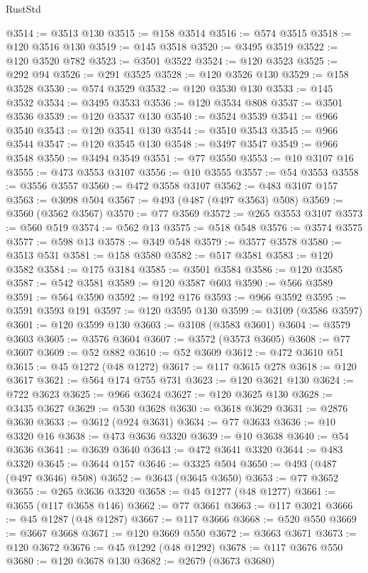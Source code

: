\begin{lexlean}{RustStd}
\begin{coremodule}
@3514 := @3513 @130
@3515 := @158 @3514
@3516 := @574 @3515
@3518 := @120 @3516 @130
@3519 := @145 @3518
@3520 := @3495 @3519
@3522 := @120 @3520 @782
@3523 := @3501 @3522
@3524 := @120 @3523
@3525 := @292 @94
@3526 := @291 @3525
@3528 := @120 @3526 @130
@3529 := @158 @3528
@3530 := @574 @3529
@3532 := @120 @3530 @130
@3533 := @145 @3532
@3534 := @3495 @3533
@3536 := @120 @3534 @808
@3537 := @3501 @3536
@3539 := @120 @3537 @130
@3540 := @3524 @3539
@3541 := @966 @3540
@3543 := @120 @3541 @130
@3544 := @3510 @3543
@3545 := @966 @3544
@3547 := @120 @3545 @130
@3548 := @3497 @3547
@3549 := @966 @3548
@3550 := @3494 @3549
@3551 := @77 @3550
@3553 := @10 @3107 @16
@3555 := @473 @3553 @3107
@3556 := @10 @3555
@3557 := @54 @3553
@3558 := @3556 @3557
@3560 := @472 @3558 @3107
@3562 := @483 @3107 @157
@3563 := @3098 @504
@3567 := @493 (@487 (@497 @3563) @508)
@3569 := @3560 (@3562 @3567)
@3570 := @77 @3569
@3572 := @265 @3553 @3107
@3573 := @560 @519
@3574 := @562 @13
@3575 := @518 @548
@3576 := @3574 @3575
@3577 := @598 @13
@3578 := @349 @548
@3579 := @3577 @3578
@3580 := @3513 @531
@3581 := @158 @3580
@3582 := @517 @3581
@3583 := @120 @3582
@3584 := @175 @3184
@3585 := @3501 @3584
@3586 := @120 @3585
@3587 := @542 @3581
@3589 := @120 @3587 @603
@3590 := @566 @3589
@3591 := @564 @3590
@3592 := @192 @176
@3593 := @966 @3592
@3595 := @3591 @3593 @191
@3597 := @120 @3595 @130
@3599 := @3109 (@3586 @3597)
@3601 := @120 @3599 @130
@3603 := @3108 (@3583 @3601)
@3604 := @3579 @3603
@3605 := @3576 @3604
@3607 := @3572 (@3573 @3605)
@3608 := @77 @3607
@3609 := @52 @882
@3610 := @52 @3609
@3612 := @472 @3610 @51
@3615 := @45 @1272 (@48 @1272)
@3617 := @117 @3615 @278
@3618 := @120 @3617
@3621 := @564 @174 @755 @731
@3623 := @120 @3621 @130
@3624 := @722 @3623
@3625 := @966 @3624
@3627 := @120 @3625 @130
@3628 := @3435 @3627
@3629 := @530 @3628
@3630 := @3618 @3629
@3631 := @2876 @3630
@3633 := @3612 (@924 @3631)
@3634 := @77 @3633
@3636 := @10 @3320 @16
@3638 := @473 @3636 @3320
@3639 := @10 @3638
@3640 := @54 @3636
@3641 := @3639 @3640
@3643 := @472 @3641 @3320
@3644 := @483 @3320
@3645 := @3644 @157
@3646 := @3325 @504
@3650 := @493 (@487 (@497 @3646) @508)
@3652 := @3643 (@3645 @3650)
@3653 := @77 @3652
@3655 := @265 @3636 @3320
@3658 := @45 @1277 (@48 @1277)
@3661 := @3655 (@117 @3658 @146)
@3662 := @77 @3661
@3663 := @117 @3021
@3666 := @45 @1287 (@48 @1287)
@3667 := @117 @3666
@3668 := @520 @550
@3669 := @3667 @3668
@3671 := @120 @3669 @550
@3672 := @3663 @3671
@3673 := @120 @3672
@3676 := @45 @1292 (@48 @1292)
@3678 := @117 @3676 @550
@3680 := @120 @3678 @130
@3682 := @2679 (@3673 @3680)

\end{coremodule}
\end{lexlean}
